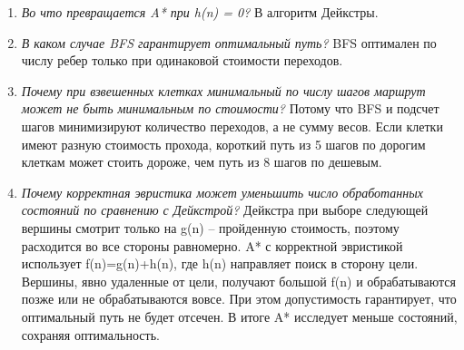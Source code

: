 \begin{enumerate}
	Согласованная эвристика дополнительно к дпокстимости требует, чтобы оценка в текущей вершине не превышала стоимость перехода к соседу плюс оценку соседа.
	\item \textit{Во что превращается A* при h(n) = 0?}\newline
	В алгоритм Дейкстры.
	\item \textit{В каком случае BFS гарантирует оптимальный путь?}\newline
	BFS оптимален по числу ребер только при одинаковой стоимости переходов.
	\item \textit{Почему при взвешенных клетках минимальный по числу шагов маршрут может не быть минимальным по стоимости?}\newline
	Потому что BFS и подсчет шагов минимизируют количество переходов, а не сумму весов. 
	Если клетки имеют разную стоимость прохода, короткий путь из 5 шагов по дорогим клеткам может стоить дороже, чем путь из 8 шагов по дешевым. 
	\item \textit{Почему корректная эвристика может уменьшить число обработанных состояний по сравнению с Дейкстрой?}\newline
	Дейкстра при выборе следующей вершины смотрит только на g(n) -- пройденную стоимость, поэтому расходится во все стороны равномерно.
	A* с корректной эвристикой использует f(n)=g(n)+h(n), где h(n) направляет поиск в сторону цели. 
	Вершины, явно удаленные от цели, получают большой f(n) и обрабатываются позже или не обрабатываются вовсе. При этом допустимость гарантирует, что оптимальный путь не будет отсечен. В итоге A* исследует меньше состояний, сохраняя оптимальность.
\end{enumerate}